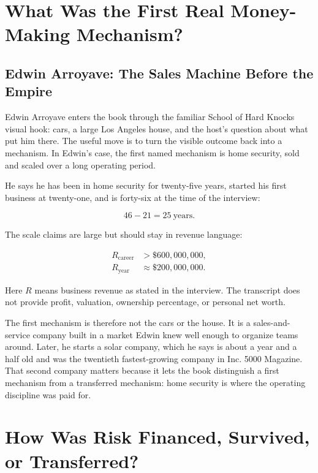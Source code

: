\documentclass[11pt,oneside]{book}
\begin{document}
\chapter{What Was the First Real Money-Making Mechanism?}

\section{Edwin Arroyave: The Sales Machine Before the Empire}

Edwin Arroyave enters the book through the familiar School of Hard Knocks visual hook: cars, a large Los Angeles house, and the host's question about what put him there. The useful move is to turn the visible outcome back into a mechanism. In Edwin's case, the first named mechanism is home security, sold and scaled over a long operating period.

He says he has been in home security for twenty-five years, started his first business at twenty-one, and is forty-six at the time of the interview:

\begin{equation}
46-21=25\ \mathrm{years}.
\end{equation}

The scale claims are large but should stay in revenue language:

\begin{align}
R_{\mathrm{career}} &> \$600{,}000{,}000,\\
R_{\mathrm{year}} &\approx \$200{,}000{,}000.
\end{align}

Here \(R\) means business revenue as stated in the interview. The transcript does not provide profit, valuation, ownership percentage, or personal net worth.

The first mechanism is therefore not the cars or the house. It is a sales-and-service company built in a market Edwin knew well enough to organize teams around. Later, he starts a solar company, which he says is about a year and a half old and was the twentieth fastest-growing company in Inc. 5000 Magazine. That second company matters because it lets the book distinguish a first mechanism from a transferred mechanism: home security is where the operating discipline was paid for.

\chapter{How Was Risk Financed, Survived, or Transferred?}
\end{document}
